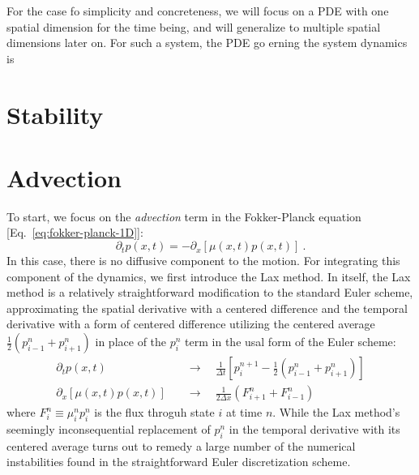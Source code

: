 \documentclass[15pt]{article}
\begin{document}
For the case fo simplicity and concreteness, we will focus on a PDE with one spatial dimension for the time being, and will generalize to multiple spatial dimensions later on. For such a system, the PDE go erning the system dynamics is

\section{Stability}


\section{Advection}
To start, we focus on the \textit{advection} term in the Fokker-Planck equation [Eq.~\eqref{eq:fokker-planck-1D}]:
\begin{equation}
    \partial_t p(x, t) = -\partial_x \left[ \mu(x, t) p(x, t) \right] \label{eq:advection-general} \ .
\end{equation}
In this case, there is no diffusive component to the motion.  For integrating this component of the dynamics, we first introduce the Lax method. In itself, the Lax method is a relatively straightforward modification to the standard Euler scheme, approximating the spatial derivative with a centered difference and the temporal derivative with a form of centered difference utilizing the centered average $\tfrac{1}{2}(p_{i-1}^n + p_{i+1}^n)$ in place of the $p_i^n$ term in the usal form of the Euler scheme:
\begin{subequations}
\begin{align}
    \partial_t p(x, t) \quad &\to \quad \frac{1}{\Delta t}\left[ p_i^{n+1} - \frac{1}{2}\left( p_{i-1}^n + p_{i+1}^n \right)\right] \label{eq:lax-time-deriv} \\
    \partial_x\left[ \mu(x, t)p(x, t) \right] \quad &\to \quad \frac{1}{2\Delta x}\left( F_{i+1}^n + F_{i-1}^n \right) \label{eq:lax-space-deriv}
\end{align}
\end{subequations}
where $F_{i}^n \equiv \mu_i^np_i^n$ is the flux throguh state $i$ at time $n$.  While the Lax method's seemingly inconsequential replacement of $p_i^n$ in the temporal derivative with its centered average turns out to remedy a large number of the numerical instabilities found in the straightforward Euler discretization scheme.
\end{document}
